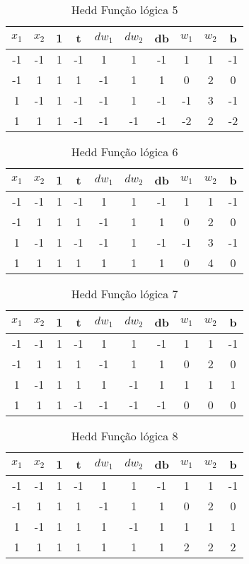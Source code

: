 \begin{table}[H]
\centering
\begin{tabular}{|c|c|c|c|c|c|c|c|c|c|}
\hline
$x_1$ & $x_2$ & 1 & t & $dw_1$ & $dw_2$ & db & $w_1$ & $w_2$ & b \\ \hline
-1 & -1 & 1 & -1 & 1 & 1 & -1 & 1 & 1 & -1\\ \hline
-1 & 1 & 1 & 1 & -1 & 1 & 1 & 0 & 2 & 0\\ \hline
1 & -1 & 1 & -1 & -1 & 1 & -1 & -1 & 3 & -1\\ \hline
1 & 1 & 1 & -1 & -1 & -1 & -1 & -2 & 2 & -2\\ \hline
\end{tabular}
\caption{Hedd Função lógica 5}\label{hedd:5}\end{table}

\begin{table}[H]
\centering
\begin{tabular}{|c|c|c|c|c|c|c|c|c|c|}
\hline
$x_1$ & $x_2$ & 1 & t & $dw_1$ & $dw_2$ & db & $w_1$ & $w_2$ & b \\ \hline
-1 & -1 & 1 & -1 & 1 & 1 & -1 & 1 & 1 & -1\\ \hline
-1 & 1 & 1 & 1 & -1 & 1 & 1 & 0 & 2 & 0\\ \hline
1 & -1 & 1 & -1 & -1 & 1 & -1 & -1 & 3 & -1\\ \hline
1 & 1 & 1 & 1 & 1 & 1 & 1 & 0 & 4 & 0\\ \hline
\end{tabular}
\caption{Hedd Função lógica 6}\label{hedd:6}\end{table}

\begin{table}[H]
\centering
\begin{tabular}{|c|c|c|c|c|c|c|c|c|c|}
\hline
$x_1$ & $x_2$ & 1 & t & $dw_1$ & $dw_2$ & db & $w_1$ & $w_2$ & b \\ \hline
-1 & -1 & 1 & -1 & 1 & 1 & -1 & 1 & 1 & -1\\ \hline
-1 & 1 & 1 & 1 & -1 & 1 & 1 & 0 & 2 & 0\\ \hline
1 & -1 & 1 & 1 & 1 & -1 & 1 & 1 & 1 & 1\\ \hline
1 & 1 & 1 & -1 & -1 & -1 & -1 & 0 & 0 & 0\\ \hline
\end{tabular}
\caption{Hedd Função lógica 7}\label{hedd:7}\end{table}

\begin{table}[H]
\centering
\begin{tabular}{|c|c|c|c|c|c|c|c|c|c|}
\hline
$x_1$ & $x_2$ & 1 & t & $dw_1$ & $dw_2$ & db & $w_1$ & $w_2$ & b \\ \hline
-1 & -1 & 1 & -1 & 1 & 1 & -1 & 1 & 1 & -1\\ \hline
-1 & 1 & 1 & 1 & -1 & 1 & 1 & 0 & 2 & 0\\ \hline
1 & -1 & 1 & 1 & 1 & -1 & 1 & 1 & 1 & 1\\ \hline
1 & 1 & 1 & 1 & 1 & 1 & 1 & 2 & 2 & 2\\ \hline
\end{tabular}
\caption{Hedd Função lógica 8}\label{hedd:8}\end{table}

